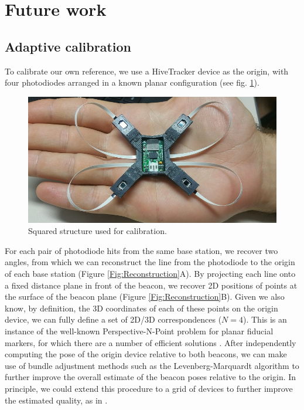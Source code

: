 \documentclass[sigchi]{acmart}
\begin{document}
\section{Future work}

\subsection{Adaptive calibration}

To calibrate our own reference, we use a HiveTracker device as the origin, with four photodiodes arranged in a known planar configuration (see fig. \ref{Fig:squared_structure}).

\begin{figure}[h]
  \centering
  \includegraphics[width=\linewidth]{Figures/squared_structure.jpg}
  \caption{Squared structure used for calibration.}
  \label{Fig:squared_structure}
\end{figure}

For each pair of photodiode hits from the same base station, we recover two angles, from which we can reconstruct the line from the photodiode to the origin of each base station (Figure \ref{Fig:Reconstruction}A). By projecting each line onto a fixed distance plane in front of the beacon, we recover 2D positions of points at the surface of the beacon plane (Figure \ref{Fig:Reconstruction}B). Given we also know, by definition, the 3D coordinates of each of these points on the origin device, we can fully define a set of 2D/3D correspondences ($N = 4$). This is an instance of the well-known Perspective-N-Point problem for planar fiducial markers, for which there are a number of efficient solutions \cite{Lepetit2008,Garrido-Jurado2014}. After independently computing the pose of the origin device relative to both beacons, we can make use of bundle adjustment methods such as the Levenberg-Marquardt algorithm \cite{Marquardt1963} to further improve the overall estimate of the beacon poses relative to the origin. In principle, we could extend this procedure to a grid of devices to further improve the estimated quality, as in \cite{Garrido-Jurado2014}.
\end{document}
